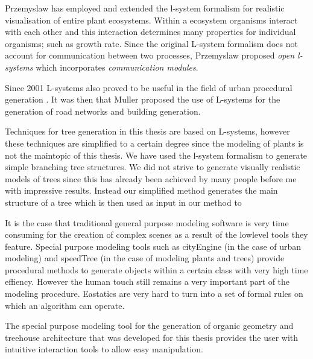Przemyslaw \citep{PrzemyslawPlants} has employed and extended the l-system formalism for realistic visualisation of entire plant ecosystems. Within a ecosystem organisms interact with each other and this interaction determines many properties for individual organisms; such as growth rate. Since the original L-system formalism does not account for communication between two processes, Przemyslaw proposed \emph{open l-systems} which incorporates \emph{communication modules}.    
  
Since 2001 L-systems also proved to be useful in the field of urban procedural generation \citep{Wonka03}. It was then that Muller proposed the use of L-systems for the generation of road networks and building generation. 


Techniques for tree generation in this thesis are based on L-systems, however these techniques are simplified to a certain degree since the modeling of plants is not the maintopic of this thesis. We have used the l-system formalism to generate simple branching tree structures. We did not strive to generate visually realistic models of trees since this has already been achieved by many people before me with impressive results. Instead our simplified method generates the main structure of a tree which is then used as input in our method to 


It is the case that traditional general purpose modeling software is very time consuming for the creation of complex scenes as a result of the lowlevel tools they feature. Special purpose modeling tools such as cityEngine \citep{Muller06} (in the case of urban modeling) and speedTree (in the case of modeling plants and trees) provide procedural methods to generate objects within a certain class with very high time effiency. However the human touch still remains a very important part of the modeling procedure. Eastatics are very hard to turn into a set of formal rules on which an algorithm can operate.

The special purpose modeling tool for the generation of organic geometry and treehouse architecture that was developed for this thesis provides the user with intuitive interaction tools to allow easy manipulation.        



